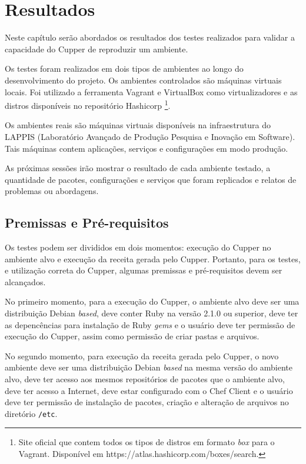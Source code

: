 \chapter{Resultados}
\label{chap:result}

Neste capítulo serão abordados os resultados dos testes realizados
para validar a capacidade do Cupper de reproduzir um ambiente.

Os testes foram realizados em dois tipos de ambientes ao longo do
desenvolvimento do projeto. Os ambientes controlados são máquinas
virtuais locais. Foi utilizado a ferramenta Vagrant e VirtualBox
como virtualizadores e as distros disponíveis no repositório Hashicorp
\footnote{Site oficial que contem todos os tipos de distros em formato \textit{box} para o Vagrant. Disponível em https://atlas.hashicorp.com/boxes/search.}.

Os ambientes reais são máquinas virtuais disponíveis na infraestrutura
do LAPPIS (Laboratório Avançado de Produção Pesquisa e Inovação em Software).
Tais máquinas contem aplicações, serviços e configurações em modo produção.

As próximas sessões irão mostrar o resultado de cada ambiente testado,
a quantidade de pacotes, configurações e serviços que foram replicados
e relatos de problemas ou abordagens.

\section{Premissas e Pré-requisitos}

Os testes podem ser divididos em dois momentos: execução do Cupper no
ambiente alvo e execução da receita gerada pelo Cupper. Portanto,
para os testes, e utilização correta do Cupper, algumas premissas
e pré-requisitos devem ser alcançados.

No primeiro momento, para a execução do Cupper, o ambiente alvo deve
ser uma distribuição Debian \textit{based}, deve conter Ruby na versão
2.1.0 ou superior, deve ter as depencências para instalação
de Ruby \textit{gems} e o usuário deve ter permissão de execução do Cupper, assim como
permissão de criar pastas e arquivos.

No segundo momento, para execução da receita gerada pelo Cupper, o novo
ambiente deve ser uma distribuição Debian \textit{based} na mesma versão do ambiente
alvo, deve ter acesso aos mesmos repositórios de pacotes que
o ambiente alvo, deve ter acesso a Internet, deve estar configurado com o Chef Client e
o usuário deve ter permissão de instalação de pacotes, criação e alteração de arquivos no
diretório \texttt{/etc}.

